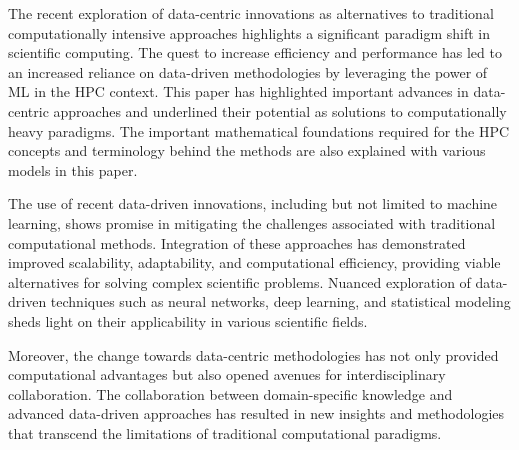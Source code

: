 \documentclass[conference]{IEEEtran}
\begin{document}
The recent exploration of data-centric innovations as alternatives to traditional computationally intensive approaches highlights a significant paradigm shift in scientific computing. The quest to increase efficiency and performance has led to an increased reliance on data-driven methodologies by leveraging the power of ML in the HPC context. This paper has highlighted important advances in data-centric approaches and underlined their potential as solutions to computationally heavy paradigms. The important mathematical foundations required for the HPC concepts and terminology behind the methods are also explained with various models in this paper.

The use of recent data-driven innovations, including but not limited to machine learning, shows promise in mitigating the challenges associated with traditional computational methods. Integration of these approaches has demonstrated improved scalability, adaptability, and computational efficiency, providing viable alternatives for solving complex scientific problems. Nuanced exploration of data-driven techniques such as neural networks, deep learning, and statistical modeling sheds light on their applicability in various scientific fields.

Moreover, the change towards data-centric methodologies has not only provided computational advantages but also opened avenues for interdisciplinary collaboration. The collaboration between domain-specific knowledge and advanced data-driven approaches has resulted in new insights and methodologies that transcend the limitations of traditional computational paradigms.
\end{document}
